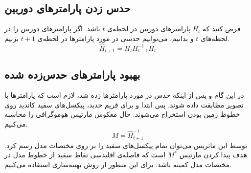 \documentclass{report}
\begin{document}
\subsection{حدس زدن پارامترهای دوربین}
فرض کنید که $H_t$ پارامترهای دوربین در لحظه‌ی $t$ باشد. اگر پارامترهای دوربین را در لحظه‌های $t$ و  بدانیم، می‌توانیم حدسی در مورد پارامترها در لحظه‌ی $t+1$ بزنیم.
\[
\hat{H}_{t+1} = H_tH_{t-1}^{-1}H_t
\]
\subsection{بهبود پارامترهای حدس‌زده شده}
در این گام و پس از اینکه حدس در مورد پارامترها زده شد، لازم است که پارامترها با تصویر مطابقت داده شوند. پس ابتدا و برای فریم جدید، پیکسل‌های سفید کاندید روی خطوط زمین بودن استخراج می‌شوند. حال معکوس مارتیس هوموگرافی را محاسبه می‌کنیم.
\[
M = \hat{H}_{t+1}^{-1}
\]
توسط این ماتریس می‌توان تمام پیکسل‌های سفید را بر روی مختصات مدل رسم کرد. هدف پیدا کردن مارتیس $M^*$ است که فاصله‌ی اقلیدسی نقاط سفید از خطوط مدل در مختصات مدل کمینه باشد. برای این منظور از روش بهینه‌سازی  استفاده می‌کنیم.
\begin{latin}
{}

\end{latin}
\end{document}
